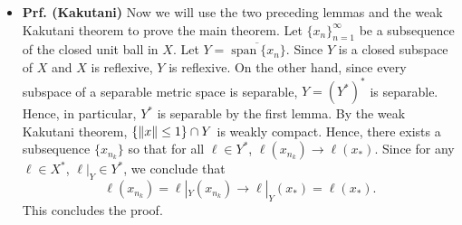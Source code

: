 \documentclass{article}
\begin{document}
\begin{itemize}
	\begin{solutions}
		Our goal is to show that given $m \in Y^{\ast\ast}$, there exists some $y \in Y$ so that for all $\ell \in Y^{\ast}$, $m(\ell) = \ell(y)$. Note that the map $\ell \mapsto \ell|_{Y}$ defines a map from $X^{\ast}$ to $Y^{\ast}$. So consider the map $X^{\ast} \ni \ell \mapsto m(\ell|_{Y})$, which defines an element in $X^{\ast}$. Since $X$ is reflexive, there exists an $x_{0} \in X$ such that $m(\ell|_{Y}) = \ell(x_{0})$ for all $\ell \in X^{\ast}$. We must show the following: 
		\begin{enumerate}[itemsep =-2pt,label= (\arabic{*})]
			\item $x_{0} \in Y$;
			\item for all $\ti{\ell} \in Y^{\ast}$, $m(\ti{\ell}) = \ti{\ell}(x_{0})$. 
		\end{enumerate}
		Let us prove each claim individually. 
		\begin{enumerate}[itemsep =-2pt,label = (\arabic{*})]
			\item Assume to the contrary that $x_{0}\notin Y$. Then there exists some $\ell \in X^{\ast}$ so that $\ell|_{Y} = 0$ and $\ell(x_{0}) \neq 0$ (by Hahn-Banach). But this is impossible by the line defining $x_{0}$. Hence, $x_{0}\in Y$. 
			\item Consider $\ti{\ell} \in Y^{\ast}$. Then by Hahn-Banach, we can produce some $\ell \in X^{\ast}$ such that $\ell|_{Y} = \ti{\ell}$. Hence, $m(\ti{\ell}) = m(\ell|_{Y}) = \ell(x) = \ti{\ell}(x_{0})$. 
		\end{enumerate}
		Hence, the proof concludes. 
	\end{solutions} 
	
	\item \textbf{Prf. (Kakutani)} Now we will use the two preceding lemmas and the weak Kakutani theorem to prove the main theorem. Let $\{x_{n}\}_{n= 1}^{\infty}$ be a subsequence of the closed unit ball in $X$. Let $Y = \overline{\operatorname{span}\{x_{n}\}}$. Since $Y$ is a closed subspace of $X$ and $X$ is reflexive, $Y$ is reflexive. On the other hand, since every subspace of a separable metric space is separable, $Y = (Y^{\ast})^{\ast}$ is separable. Hence, in particular, $Y^{\ast}$ is separable by the first lemma. By the weak Kakutani theorem, $\{\left\Vert x \right\Vert \leq 1\} \cap Y$ is weakly compact. Hence, there exists a subsequence $\{x_{n_{k}}\}$ so that for all $\ell \in Y^{\ast}$, $\ell(x_{n_{k}}) \to \ell(x_{\ast})$. Since for any $\ell \in X^{\ast}$, $\ell|_{Y} \in Y^{\ast}$, we conclude that 
	\begin{equation}
		\ell(x_{n_{k}}) = \ell|_{Y}(x_{n_{k}}) \longrightarrow \ell|_{Y}(x_{\ast}) = \ell(x_{\ast}). 
	\end{equation} 
	This concludes the proof. 
\end{itemize}
\end{document}
